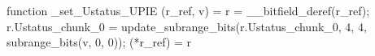 function _set_Ustatus_UPIE (r_ref, v) = {
    r = __bitfield_deref(r_ref);
    r.Ustatus_chunk_0 = update_subrange_bits(r.Ustatus_chunk_0, 4, 4, subrange_bits(v, 0, 0));
    (*r_ref) = r
}
